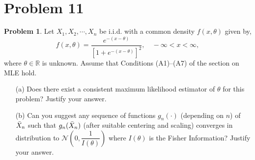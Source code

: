 \documentclass[12pt]{article}
\newcommand{\R}{\mathbb{R}}
\newcommand{\normal}{\mathcal{N}}
\theoremstyle{definition}
\newtheorem*{prb}{Problem}
\newenvironment{problem}{\begin{tcolorbox}[colback=blue!5!white,colframe=blue!75!black, parbox = true] \begin{prb}  }{\end{prb}\end{tcolorbox} }
\numberwithin{equation}{section}
\begin{document}
\pagebreak
\section{Problem 11}

\begin{problem}
Let $X_1,X_2,\cdots,X_n$ be i.i.d. with a common density $f(x,\theta)$ given by,
$$f(x,\theta) = \dfrac{e^{-(x-\theta)}}{\left[ 1+e^{-(x-\theta)} \right]^2}, \quad -\infty<x<\infty,$$
where $\theta \in \R$ is unknown. Assume that Conditions (A1)–(A7) of the section
on MLE hold.
\begin{itemize}
    \item[(a)] Does there exist a consistent maximum likelihood estimator of $\theta$ for this problem? Justify your answer.
     \item[(b)] Can you suggest any sequence of functions $g_n(\cdot)$ (depending on $n$) of $\Bar{X}_n$ such that $g_n(\Bar{X}_n)$ (after suitable centering and scaling) converges in distribution to $\normal\left(0,\dfrac{1}{I(\theta)}\right)$ where $I(\theta)$ is the Fisher Information? Justify your answer. 
\end{itemize}
\end{problem}
\end{document}
